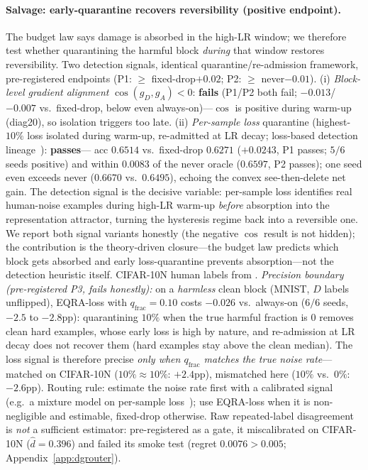 \documentclass{article}
\begin{document}
\paragraph{Salvage: early-quarantine recovers reversibility (positive endpoint).}
The budget law says damage is absorbed in the high-LR window; we therefore test whether
quarantining the harmful block \emph{during} that window restores reversibility. Two detection
signals, identical quarantine/re-admission framework, pre-registered endpoints
(P1: $\ge$ fixed-drop$+0.02$; P2: $\ge$ never$-0.01$). (i) \emph{Block-level gradient
alignment} $\cos(g_D,g_A)<0$: \textbf{fails} (P1/P2 both fail; $-0.013$/$-0.007$ vs.\ fixed-drop,
below even always-on)---$\cos$ is positive during warm-up (diag20), so isolation triggers too
late. (ii) \emph{Per-sample loss} quarantine (highest-$10\%$ loss isolated during warm-up,
re-admitted at LR decay; loss-based detection
lineage~\citep{arazo2019unsupervised,jiang2018mentornet,han2018coteaching}): \textbf{passes}---
acc $0.6514$ vs.\ fixed-drop $0.6271$ ($+0.0243$, P1 passes; $5/6$ seeds positive) and within
$0.0083$ of the never oracle ($0.6597$, P2 passes); one seed even exceeds never ($0.6670$ vs.\
$0.6495$), echoing the convex see-then-delete net gain. The detection signal is the decisive
variable: per-sample loss identifies real human-noise examples during high-LR warm-up
\emph{before} absorption into the representation attractor, turning the hysteresis regime back
into a reversible one. We report both signal variants honestly (the negative $\cos$ result is
not hidden); the contribution is the theory-driven closure---the budget law predicts which
block gets absorbed and early loss-quarantine prevents absorption---not the detection heuristic
itself. CIFAR-10N human labels from \citet{wei2022cifar10n}.
\emph{Precision boundary (pre-registered P3, fails honestly):} on a \emph{harmless} clean block
(MNIST, $D$ labels unflipped), EQRA-loss with $q_{\text{frac}}{=}0.10$ costs $-0.026$ vs.\
always-on ($6/6$ seeds, $-2.5$ to $-2.8$pp): quarantining $10\%$ when the true harmful fraction
is $0$ removes clean hard examples, whose early loss is high by nature, and re-admission at LR
decay does not recover them (hard examples stay above the clean median). The loss signal is
therefore precise \emph{only when $q_{\text{frac}}$ matches the true noise rate}---matched on
CIFAR-10N ($10\%{\approx}10\%$: $+2.4$pp), mismatched here ($10\%$ vs.\ $0\%$: $-2.6$pp).
Routing rule: estimate the noise rate first with a calibrated signal (e.g.\ a mixture model on per-sample
loss~\citep{arazo2019unsupervised}); use EQRA-loss when it is non-negligible and estimable,
fixed-drop otherwise. Raw repeated-label disagreement is \emph{not} a sufficient estimator:
pre-registered as a gate, it miscalibrated on CIFAR-10N ($\hat d{=}0.396$) and failed its
smoke test (regret $0.0076>0.005$; Appendix~\ref{app:dgrouter}).
\end{document}
